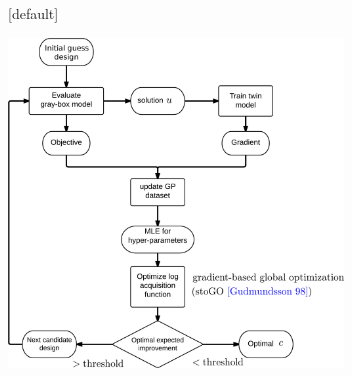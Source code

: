 \documentclass{beamer}
\begin{document}
{
\makeatletter
{}[default]
\def\beamer@entrycode{\vspace*{-\headheight}} 
\makeatother
\begin{frame}
    \begin{center}
        \includegraphics[width=8.9cm]{opt_framework.png}
    \end{center}
\end{frame}
}
\end{document}
